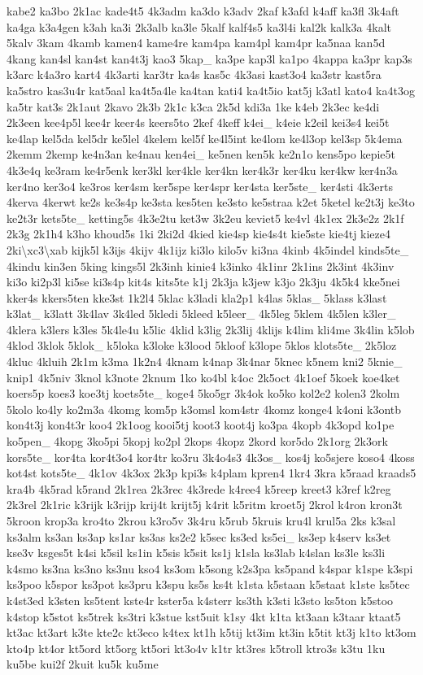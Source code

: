 \begin{DoxyCompactItemize}
kabe2 ka3bo 2k1ac kade4t5 4k3adm ka3do k3adv 2kaf k3afd k4aff ka3fl 3k4aft ka4ga k3a4gen k3ah ka3i 2k3alb ka3le 5kalf kalf4s5 ka3l4i kal2k kalk3a 4kalt 5kalv 3kam 4kamb kamen4 kame4re kam4pa kam4pl kam4pr ka5naa kan5d 4kang kan4sl kan4st kan4t3j kao3 5kap\-\_\- ka3pe kap3l ka1po 4kappa ka3pr kap3s k3arc k4a3ro kart4 4k3arti kar3tr ka4s kas5c 4k3asi kast3o4 ka3str kast5ra ka5stro kas3u4r kat5aal ka4t5a4le ka4tan kati4 ka4t5io kat5j k3atl kato4 ka4t3og ka5tr kat3s 2k1aut 2kavo 2k3b 2k1c k3ca 2k5d kdi3a 1ke k4eb 2k3ec ke4di 2k3een kee4p5l kee4r keer4s keers5to 2kef 4keff k4ei\-\_\- k4eie k2eil kei3s4 kei5t ke4lap kel5da kel5dr ke5lel 4kelem kel5f ke4l5int ke4lom ke4l3op kel3sp 5k4ema 2kemm 2kemp ke4n3an ke4nau ken4ei\-\_\- ke5nen ken5k ke2n1o kens5po kepie5t 4k3e4q ke3ram ke4r5enk ker3kl ker4kle ker4kn ker4k3r ker4ku ker4kw ker4n3a ker4no ker3o4 ke3ros ker4sm ker5spe ker4spr ker4sta ker5ste\-\_\- ker4sti 4k3erts 4kerva 4kerwt ke2s ke3s4p ke3sta kes5ten ke3sto ke5straa k2et 5ketel ke2t3j ke3to ke2t3r kets5te\-\_\- ketting5s 4k3e2tu ket3w 3k2eu keviet5 ke4vl 4k1ex 2k3e2z 2k1f 2k3g 2k1h4 k3ho khoud5s 1ki 2ki2d 4kied kie4sp kie4s4t kie5ste kie4tj kieze4 2ki\textbackslash{}xc3\textbackslash{}xab kijk5l k3ijs 4kijv 4k1ijz ki3lo kilo5v ki3na 4kinb 4k5indel kinds5te\-\_\- 4kindu kin3en 5king kings5l 2k3inh kinie4 k3inko 4k1inr 2k1ins 2k3int 4k3inv ki3o ki2p3l ki5se ki3s4p kit4s kits5te k1j 2k3ja k3jew k3jo 2k3ju 4k5k4 kke5nei kker4s kkers5ten kke3st 1k2l4 5klac k3ladi kla2p1 k4las 5klas\-\_\- 5klass k3last k3lat\-\_\- k3latt 3k4lav 3k4led 5kledi 5kleed k5leer\-\_\- 4k5leg 5klem 4k5len k3ler\-\_\- 4klera k3lers k3les 5k4le4u k5lic 4klid k3lig 2k3lij 4klijs k4lim kli4me 3k4lin k5lob 4klod 3klok 5klok\-\_\- k5loka k3loke k3lood 5kloof k3lope 5klos klots5te\-\_\- 2k5loz 4kluc 4kluih 2k1m k3ma 1k2n4 4knam k4nap 3k4nar 5knec k5nem kni2 5knie\-\_\- knip1 4k5niv 3knol k3note 2knum 1ko ko4bl k4oc 2k5oct 4k1oef 5koek koe4ket koers5p koes3 koe3tj koets5te\-\_\- koge4 5ko5gr 3k4ok ko5ko kol2e2 kolen3 2kolm 5kolo ko4ly ko2m3a 4komg kom5p k3omsl kom4str 4komz konge4 k4oni k3ontb kon4t3j kon4t3r koo4 2k1oog kooi5tj koot3 koot4j ko3pa 4kopb 4k3opd ko1pe ko5pen\-\_\- 4kopg 3ko5pi 5kopj ko2pl 2kops 4kopz 2kord kor5do 2k1org 2k3ork kors5te\-\_\- kor4ta kor4t3o4 kor4tr ko3ru 3k4o4s3 4k3os\-\_\- kos4j ko5sjere koso4 4koss kot4st kots5te\-\_\- 4k1ov 4k3ox 2k3p kpi3s k4plam kpren4 1kr4 3kra k5raad kraads5 kra4b 4k5rad k5rand 2k1rea 2k3rec 4k3rede k4ree4 k5reep kreet3 k3ref k2reg 2k3rel 2k1ric k3rijk k3rijp krij4t krijt5j k4rit k5ritm kroet5j 2krol k4ron kron3t 5kroon krop3a kro4to 2krou k3ro5v 3k4ru k5rub 5kruis kru4l krul5a 2ks k3sal ks3alm ks3an ks3ap ks1ar ks3as ks2e2 k5sec ks3ed ks5ei\-\_\- ks3ep k4serv ks3et kse3v ksges5t k4si k5sil ks1in k5sis k5sit ks1j k1sla ks3lab k4slan ks3le ks3li k4smo ks3na ks3no ks3nu kso4 ks3om k5song k2s3pa ks5pand k4spar k1spe k3spi ks3poo k5spor ks3pot ks3pru k3spu ks5s ks4t k1sta k5staan k5staat k1ste ks5tec k4st3ed k3sten ks5tent kste4r kster5a k4sterr ks3th k3sti k3sto ks5ton k5stoo k4stop k5stot ks5trek ks3tri k3stue kst5uit k1sy 4kt k1ta kt3aan k3taar ktaat5 kt3ac kt3art k3te kte2c kt3eco k4tex kt1h k5tij kt3im kt3in k5tit kt3j k1to kt3om kto4p kt4or kt5ord kt5org kt5ori kt3o4v k1tr kt3res k5troll ktro3s k3tu 1ku ku5be kui2f 2kuit ku5k ku5me 
\end{DoxyCompactItemize}
